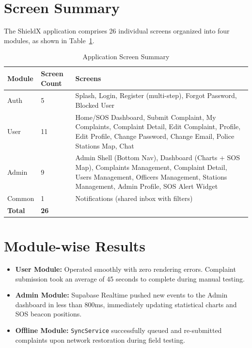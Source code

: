 \documentclass[12pt, a4paper, twoside, openany]{report}
\begin{document}
\section{Screen Summary}
The ShieldX application comprises 26 individual screens organized into four modules, as shown in Table~\ref{tab:screens}.
\begin{table}[ht]
\centering
\caption{Application Screen Summary}
\label{tab:screens}
\begin{tabularx}{\textwidth}{p{2cm} p{2.5cm} X}
\toprule
\textbf{Module} & \textbf{Screen Count} & \textbf{Screens} \\
\midrule
Auth & 5 & Splash, Login, Register (multi-step), Forgot Password, Blocked User \\
\addlinespace
User & 11 & Home/SOS Dashboard, Submit Complaint, My Complaints, Complaint Detail, Edit Complaint, Profile, Edit Profile, Change Password, Change Email, Police Stations Map, Chat \\
\addlinespace
Admin & 9 & Admin Shell (Bottom Nav), Dashboard (Charts + SOS Map), Complaints Management, Complaint Detail, Users Management, Officers Management, Stations Management, Admin Profile, SOS Alert Widget \\
\addlinespace
Common & 1 & Notifications (shared inbox with filters) \\
\midrule
\textbf{Total} & \textbf{26} & \\
\bottomrule
\end{tabularx}
\end{table}

\section{Module-wise Results}
\begin{itemize}[label={}, itemsep=1em]
    \item \textbf{User Module:} Operated smoothly with zero rendering errors. Complaint submission took an average of 45 seconds to complete during manual testing.
    \item \textbf{Admin Module:} Supabase Realtime pushed new events to the Admin dashboard in less than 800ms, immediately updating statistical charts and SOS beacon positions.
    \item \textbf{Offline Module:} \texttt{SyncService} successfully queued and re-submitted complaints upon network restoration during field testing.
\end{itemize}
\end{document}
